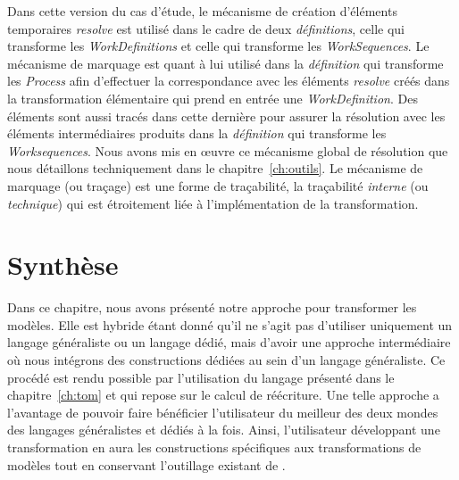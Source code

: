 Dans cette version du cas d'étude, le mécanisme de création d'éléments
temporaires \emph{resolve} est utilisé dans le cadre de deux
\emph{définitions}, celle qui transforme les \emph{WorkDefinitions} et celle
qui transforme les \emph{WorkSequences}. Le mécanisme de marquage est quant à
lui utilisé dans la \emph{définition} qui transforme les \emph{Process} afin
d'effectuer la correspondance avec les éléments \emph{resolve} créés dans la
transformation élémentaire qui prend en entrée une \emph{WorkDefinition}. Des
éléments sont aussi tracés dans cette dernière pour assurer la résolution avec
les éléments intermédiaires produits dans la \emph{définition} qui transforme
les \emph{Worksequences}. Nous avons mis en œuvre ce mécanisme global de
résolution que nous détaillons techniquement dans le chapitre~\ref{ch:outils}.
Le mécanisme de marquage (ou traçage) est une forme de traçabilité, la
traçabilité \emph{interne} (ou \emph{technique}) qui est étroitement liée à
l'implémentation de la transformation.


\section{Synthèse} \label{ch:approach:synth}

Dans ce chapitre, nous avons présenté notre approche pour transformer les
modèles. Elle est hybride étant donné qu'il ne s'agit pas d'utiliser uniquement
un langage généraliste ou un langage dédié, mais d'avoir une approche
intermédiaire où nous intégrons des constructions dédiées au sein d'un langage
généraliste. Ce procédé est rendu possible par l'utilisation du langage {\tom}
présenté dans le chapitre~\ref{ch:tom} et qui repose sur le calcul de
réécriture. Une telle approche a l'avantage de pouvoir faire bénéficier
l'utilisateur du meilleur des deux mondes des langages généralistes et dédiés à
la fois. Ainsi, l'utilisateur développant une transformation en {\tomjava} aura
les constructions spécifiques aux transformations de modèles tout en conservant
l'outillage existant de {\java}.

